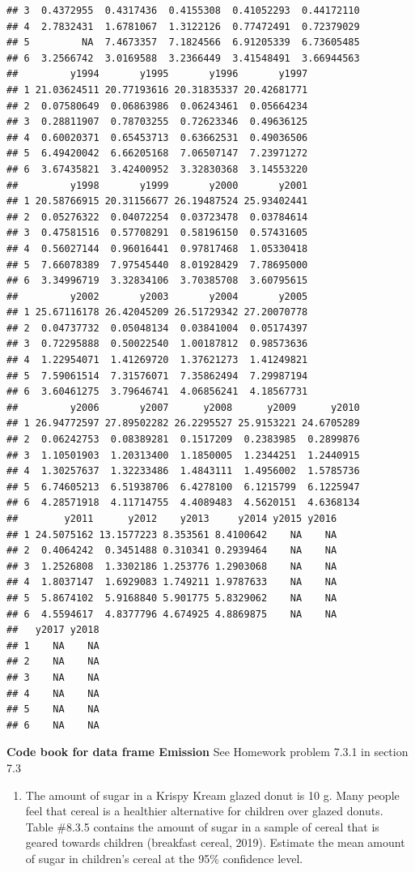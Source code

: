 \documentclass[
]{book}
\providecommand{\tightlist}{%
  \setlength{\itemsep}{0pt}\setlength{\parskip}{0pt}}
\begin{document}
\begin{verbatim}
## 3  0.4372955  0.4317436  0.4155308  0.41052293  0.44172110
## 4  2.7832431  1.6781067  1.3122126  0.77472491  0.72379029
## 5         NA  7.4673357  7.1824566  6.91205339  6.73605485
## 6  3.2566742  3.0169588  3.2366449  3.41548491  3.66944563
##         y1994       y1995       y1996       y1997
## 1 21.03624511 20.77193616 20.31835337 20.42681771
## 2  0.07580649  0.06863986  0.06243461  0.05664234
## 3  0.28811907  0.78703255  0.72623346  0.49636125
## 4  0.60020371  0.65453713  0.63662531  0.49036506
## 5  6.49420042  6.66205168  7.06507147  7.23971272
## 6  3.67435821  3.42400952  3.32830368  3.14553220
##         y1998       y1999       y2000       y2001
## 1 20.58766915 20.31156677 26.19487524 25.93402441
## 2  0.05276322  0.04072254  0.03723478  0.03784614
## 3  0.47581516  0.57708291  0.58196150  0.57431605
## 4  0.56027144  0.96016441  0.97817468  1.05330418
## 5  7.66078389  7.97545440  8.01928429  7.78695000
## 6  3.34996719  3.32834106  3.70385708  3.60795615
##         y2002       y2003       y2004       y2005
## 1 25.67116178 26.42045209 26.51729342 27.20070778
## 2  0.04737732  0.05048134  0.03841004  0.05174397
## 3  0.72295888  0.50022540  1.00187812  0.98573636
## 4  1.22954071  1.41269720  1.37621273  1.41249821
## 5  7.59061514  7.31576071  7.35862494  7.29987194
## 6  3.60461275  3.79646741  4.06856241  4.18567731
##         y2006       y2007      y2008      y2009      y2010
## 1 26.94772597 27.89502282 26.2295527 25.9153221 24.6705289
## 2  0.06242753  0.08389281  0.1517209  0.2383985  0.2899876
## 3  1.10501903  1.20313400  1.1850005  1.2344251  1.2440915
## 4  1.30257637  1.32233486  1.4843111  1.4956002  1.5785736
## 5  6.74605213  6.51938706  6.4278100  6.1215799  6.1225947
## 6  4.28571918  4.11714755  4.4089483  4.5620151  4.6368134
##        y2011      y2012    y2013     y2014 y2015 y2016
## 1 24.5075162 13.1577223 8.353561 8.4100642    NA    NA
## 2  0.4064242  0.3451488 0.310341 0.2939464    NA    NA
## 3  1.2526808  1.3302186 1.253776 1.2903068    NA    NA
## 4  1.8037147  1.6929083 1.749211 1.9787633    NA    NA
## 5  5.8674102  5.9168840 5.901775 5.8329062    NA    NA
## 6  4.5594617  4.8377796 4.674925 4.8869875    NA    NA
##   y2017 y2018
## 1    NA    NA
## 2    NA    NA
## 3    NA    NA
## 4    NA    NA
## 5    NA    NA
## 6    NA    NA
\end{verbatim}

\textbf{Code book for data frame Emission} See Homework problem 7.3.1 in section 7.3

\begin{enumerate}
\def\labelenumi{\arabic{enumi}.}
\setcounter{enumi}{1}
\tightlist
\item
  The amount of sugar in a Krispy Kream glazed donut is 10 g. Many people feel that cereal is a healthier alternative for children over glazed donuts. Table \#8.3.5 contains the amount of sugar in a sample of cereal that is geared towards children (breakfast cereal, 2019). Estimate the mean amount of sugar in children's cereal at the 95\% confidence level.
\end{enumerate}
\end{document}
